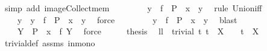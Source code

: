 \begin{isabellebody}
\ {\isacharparenleft}simp\ add{\isacharcolon}\ image{\isacharunderscore}Collect{\isacharunderscore}mem{\isacharparenright}\isanewline
\ \ \isamarkupfalse%
\ \isamarkupfalse%
\ {\isachardoublequoteopen}{\isasymdots}\ {\isasymlongleftrightarrow}\ {\isacharparenleft}{\isasymexists}\ y\ {\isasymin}\ {\isacharparenleft}f\ {\isacharbackquote}\ P{\isacharparenright}\ {\isachardot}\ x\ {\isasymin}\ y{\isacharparenright}{\isachardoublequoteclose}\ \isamarkupfalse%
\ {\isacharparenleft}rule\ Union{\isacharunderscore}iff{\isacharparenright}\isanewline
\ \ \isamarkupfalse%
\ \isamarkupfalse%
\ {\isachardoublequoteopen}{\isasymdots}\ {\isasymlongleftrightarrow}\ {\isacharparenleft}{\isasymexists}\ y\ {\isachardot}\ y\ {\isasymin}\ {\isacharparenleft}f\ {\isacharbackquote}\ P{\isacharparenright}\ {\isacharampersand}\ x\ {\isasymin}\ y{\isacharparenright}{\isachardoublequoteclose}\ \isamarkupfalse%
\ force\isanewline
\ \ \isamarkupfalse%
\ \isamarkupfalse%
\ {\isachardoublequoteopen}{\isasymdots}\ {\isasymlongleftrightarrow}\ {\isacharparenleft}{\isasymexists}\ y\ {\isasymin}\ {\isacharparenleft}f\ {\isacharbackquote}\ P{\isacharparenright}\ {\isachardot}\ x\ {\isasymin}\ y{\isacharparenright}{\isachardoublequoteclose}\ \isamarkupfalse%
\ blast\isanewline
\ \ \isamarkupfalse%
\ \isamarkupfalse%
\ {\isachardoublequoteopen}{\isasymdots}\ {\isasymlongleftrightarrow}\ {\isacharparenleft}{\isasymexists}\ Y\ {\isasymin}\ P\ {\isachardot}\ x\ {\isasymin}\ {\isacharparenleft}f\ Y{\isacharparenright}{\isacharparenright}{\isachardoublequoteclose}\ \isamarkupfalse%
\ force\isanewline
\ \ \isamarkupfalse%
\ \isamarkupfalse%
\ {\isacharquery}thesis\ \isacommand{{\isachardot}}\isamarkupfalse%
\isanewline
{}\isamarkupfalse%
%
\endisatagproof
{\isafoldproof}%
%
\isadelimproof
\isanewline
%
\endisadelimproof
\isanewline
\isanewline
\isanewline
{}\isamarkupfalse%
\ ll{}{}{\isacharcolon}\ \ {\isachardoublequoteopen}trivial\ t{\isachardoublequoteclose}\ {\isachardoublequoteopen}t\ {\isasyminter}\ X\ {\isasymnoteq}\ {\isacharbraceleft}{\isacharbraceright}{\isachardoublequoteclose}\ \ {\isachardoublequoteopen}t\ {\isasymsubseteq}\ X{\isachardoublequoteclose}%
\isadelimproof
\ %
\endisadelimproof
%
\isatagproof
{}\isamarkupfalse%
\ trivial{\isacharunderscore}def\ assms\ in{\isacharunderscore}mono\ \isamarkupfalse%

\end{isabellebody}
